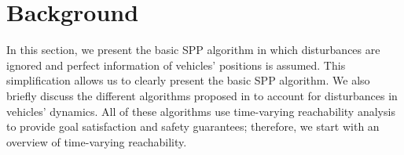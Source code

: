 \section{Background \label{sec:background}}
In this section, we present the basic SPP algorithm \cite{Chen15c} in which disturbances are ignored and perfect information of vehicles' positions is assumed. This simplification allows us to clearly present the basic SPP algorithm. We also briefly discuss the different algorithms proposed in \cite{Bansal2017} to account for disturbances in vehicles' dynamics. All of these algorithms use time-varying reachability analysis to provide goal satisfaction and safety guarantees; therefore, we start with an overview of time-varying reachability.

%

